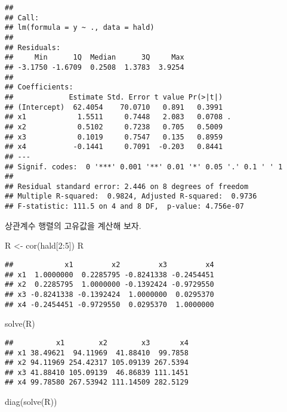 \documentclass[
]{book}
\newenvironment{Shaded}{\begin{snugshade}}{\end{snugshade}}
\newcommand{\DecValTok}[1]{\textcolor[rgb]{0.00,0.00,0.81}{#1}}
\newcommand{\FunctionTok}[1]{\textcolor[rgb]{0.00,0.00,0.00}{#1}}
\newcommand{\NormalTok}[1]{#1}
\newcommand{\OtherTok}[1]{\textcolor[rgb]{0.56,0.35,0.01}{#1}}
\newcommand{\SpecialCharTok}[1]{\textcolor[rgb]{0.00,0.00,0.00}{#1}}
\begin{document}
\begin{verbatim}
## 
## Call:
## lm(formula = y ~ ., data = hald)
## 
## Residuals:
##     Min      1Q  Median      3Q     Max 
## -3.1750 -1.6709  0.2508  1.3783  3.9254 
## 
## Coefficients:
##             Estimate Std. Error t value Pr(>|t|)  
## (Intercept)  62.4054    70.0710   0.891   0.3991  
## x1            1.5511     0.7448   2.083   0.0708 .
## x2            0.5102     0.7238   0.705   0.5009  
## x3            0.1019     0.7547   0.135   0.8959  
## x4           -0.1441     0.7091  -0.203   0.8441  
## ---
## Signif. codes:  0 '***' 0.001 '**' 0.01 '*' 0.05 '.' 0.1 ' ' 1
## 
## Residual standard error: 2.446 on 8 degrees of freedom
## Multiple R-squared:  0.9824, Adjusted R-squared:  0.9736 
## F-statistic: 111.5 on 4 and 8 DF,  p-value: 4.756e-07
\end{verbatim}

상관계수 행렬의 고유값을 계산해 보자.

\begin{Shaded}
\begin{Highlighting}[]
\NormalTok{R }\OtherTok{\textless{}{-}} \FunctionTok{cor}\NormalTok{(hald[}\DecValTok{2}\SpecialCharTok{:}\DecValTok{5}\NormalTok{])}
\NormalTok{R}
\end{Highlighting}
\end{Shaded}

\begin{verbatim}
##            x1         x2         x3         x4
## x1  1.0000000  0.2285795 -0.8241338 -0.2454451
## x2  0.2285795  1.0000000 -0.1392424 -0.9729550
## x3 -0.8241338 -0.1392424  1.0000000  0.0295370
## x4 -0.2454451 -0.9729550  0.0295370  1.0000000
\end{verbatim}

\begin{Shaded}
\begin{Highlighting}[]
\FunctionTok{solve}\NormalTok{(R)}
\end{Highlighting}
\end{Shaded}

\begin{verbatim}
##          x1        x2        x3       x4
## x1 38.49621  94.11969  41.88410  99.7858
## x2 94.11969 254.42317 105.09139 267.5394
## x3 41.88410 105.09139  46.86839 111.1451
## x4 99.78580 267.53942 111.14509 282.5129
\end{verbatim}

\begin{Shaded}
\begin{Highlighting}[]
\FunctionTok{diag}\NormalTok{(}\FunctionTok{solve}\NormalTok{(R))}
\end{Highlighting}
\end{Shaded}
\end{document}
